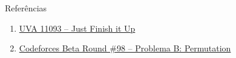 \begin{frame}[fragile]{Referências}

    \begin{enumerate}
        \item \href{https://uva.onlinejudge.org/index.php?option=com_onlinejudge&Itemid=8&category=24&page=show_problem&problem=2034}{UVA 11093 -- Just Finish it Up}

        \item \href{https://codeforces.com/problemset/problem/137/B}{Codeforces Beta Round \#98 -- Problema B: Permutation}
    \end{enumerate}

\end{frame}
